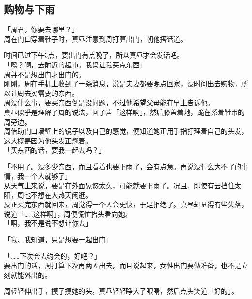 \subsection{购物与下雨}

「周君，你要去哪里？」\\

周在门口穿着鞋子时，真昼注意到周打算出门，朝他搭话道。

时间已过下午3点，要出门有点晚了，所以真昼才会发话吧。\\

「嗯？啊，去附近的超市。我妈让我买点东西」\\

周并不是想出门才出门的。\\

刚刚，周在手机上收到了一条消息，说是夫妻都要晚点回家，没时间出去购物，所以让周去买需要的东西。\\

周没什么事，要买东西倒是没问题，不过他希望父母能在早上告诉他。\\

真昼似乎是理解了周的说法，回了声「这样啊」，然后膝盖着地，跪在系着鞋带的周旁边。\\

周借助门口墙壁上的镜子以及自己的感觉，便知道她正用手指打理着自己的头发，这大概是因为他头发正翘着。\\

「买东西的话，要我一起去吗？」

「不用了。没多少东西，而且看着也要下雨了，会有点急。再说没什么大不了的事情，我一个人就够了」\\

从天气上来说，要是在外面晃悠太久，可能就要下雨了。况且，即使有云挡住太阳，周也不想在大热天闲逛。\\

反正买完东西就回来，周觉得一个人会更快，于是拒绝了。真昼却显得有些失落，说道「……这样啊」，周便慌忙抬头看向她。\\

「啊，我不是说不想让你去」

「我、我知道，只是想要一起出门」

「……下次会去约会的，好吧？」\\

要出门的话，周打算下次再两人出去，而且说起来，女性出门要做准备，也不是立刻就能外出的。

周轻轻伸出手，摸了摸她的头。真昼轻轻睁大了眼睛，然后点头笑道「好的」。\\

